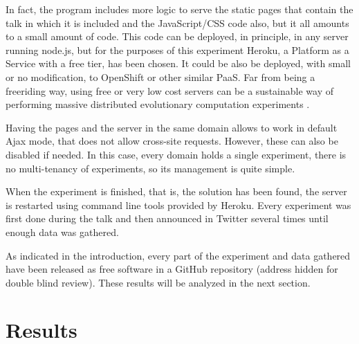 \documentclass{sig-alternate}
\begin{document}
In fact, the program includes more logic to serve the static pages
that contain the talk in which it is included and the JavaScript/CSS
code also, but it all amounts to a small amount of code. This code can
be deployed, in principle, in any server running node.js, but for the
purposes of this experiment Heroku, a Platform as a Service with a
free tier, has been chosen. It could be also be deployed, with small
or no modification, to OpenShift or other similar PaaS. Far from being
a freeriding way, using free or very low cost servers can be a
sustainable way of performing massive distributed evolutionary
computation experiments \cite{Merelo2014,jj:idc:lowcost}.

Having the pages and the server in the same domain allows to work in
default Ajax mode, that does not allow cross-site requests. However,
these can also be disabled if needed. In this case, every domain holds
a single experiment, there is no multi-tenancy of experiments, so its
management is quite simple.

When the experiment is finished, that is, the solution has been found,
the server is restarted using  command line tools provided by
Heroku. Every experiment was first done during the talk and then
announced in Twitter several times until enough data was gathered.

As indicated in the introduction, every part of the experiment and
data gathered have been released as free software in a GitHub
repository (address hidden for double blind review). These results
will be analyzed in the next section.

\section{Results}
\label{sec:res}
\end{document}
